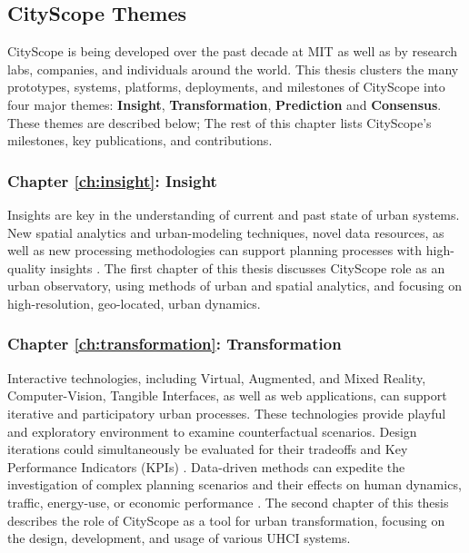 {    \subsection{CityScope Themes}
    {
        CityScope is being developed over the past decade at MIT as well as by research labs, companies, and individuals around the world. This thesis clusters the many prototypes, systems, platforms, deployments, and milestones of CityScope into four major themes: \textbf{Insight}, \textbf{Transformation}, \textbf{Prediction} and \textbf{Consensus}. These themes are described below; The rest of this chapter lists CityScope's milestones, key publications, and contributions.


        \subsubsection{Chapter \eqref{ch:insight}: Insight}
        {
            Insights are key in the understanding of current and past state of urban systems. New spatial analytics and urban-modeling techniques, novel data resources, as well as new processing methodologies can support planning processes with high-quality insights \cite{salganik_bit_2017, Kitchin2014, ben-joseph2001}. The first chapter of this thesis discusses CityScope role as an urban observatory, using methods of urban and spatial analytics, and focusing on high-resolution, geo-located, urban dynamics.
        }

        \subsubsection{Chapter \eqref{ch:transformation}: Transformation}
        {
            Interactive technologies, including Virtual, Augmented, and Mixed Reality, Computer-Vision, Tangible Interfaces, as well as web applications, can support iterative and participatory urban processes. These technologies provide playful and exploratory environment to examine counterfactual scenarios. Design iterations could simultaneously be evaluated for their tradeoffs and Key Performance Indicators (KPIs) \cite{Ben-Joseph2013, Ben-Joseph2004,Ishii2008}. Data-driven methods can expedite the investigation of complex planning scenarios and their effects on human dynamics, traffic, energy-use, or economic performance \cite{Foth2011, Song2010}.
            The second chapter of this thesis describes the role of CityScope as a tool for urban transformation, focusing on the design, development, and usage of various UHCI systems.
        }

}}
